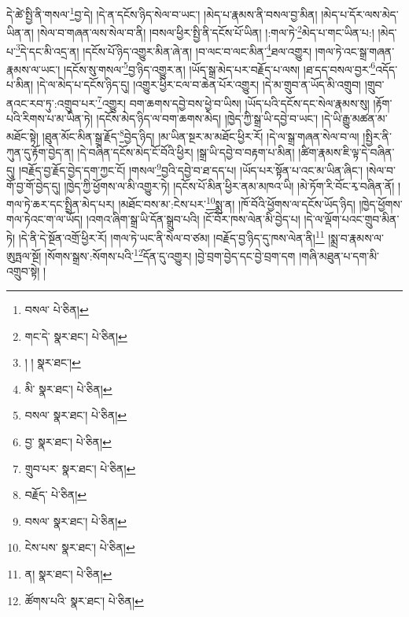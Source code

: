 དེ་ཚེ་སྤྱི་ནི་གསལ་\footnote{བསལ་  པེ་ཅིན། }བྱ་དེ། །དེ་ན་དངོས་ཉིད་སེལ་བ་ཡང་། །མེད་པ་རྣམས་ནི་བསལ་བྱ་མིན། །མེད་པ་དོར་ལས་མེད་ཡིན་ན། །སེལ་བ་གཞན་ལས་སེལ་བ་ནི། །བསལ་ཕྱིར་སྤྱི་ནི་དངོས་པོ་ཡིན། །:གལ་ཏེ་\footnote{གང་དེ་  སྣར་ཐང་།  པེ་ཅིན། }མེད་པ་གང་ཡིན་པ:། །མེད་པ་\footnote{། །  སྣར་ཐང་། }དེ་དང་མི་འདྲ་ན། །དངོས་པོ་ཉིད་འགྱུར་མིན་ཞེ་ན། །བ་ལང་བ་ལང་མིན་\footnote{མི་  སྣར་ཐང་།  པེ་ཅིན། }ཐལ་འགྱུར། །གལ་ཏེ་འང་སྒྲ་གཞན་རྣམས་ལ་ཡང་། །དངོས་སུ་གསལ་\footnote{བསལ་  སྣར་ཐང་།  པེ་ཅིན། }བྱ་ཉིད་འགྱུར་ན། །ཡོད་སྒྲ་མེད་པར་བརྗོད་པ་ལས། །ཐ་དད་བསལ་བྱར་\footnote{བྱ་  སྣར་ཐང་།  པེ་ཅིན། }འདོད་པ་མིན། །དེ་ལ་མེད་པ་དངོས་ཉིད་དུ། །འགྱུར་ཕྱིར་ངལ་བ་ཆེན་པོར་འགྱུར། །དེ་མ་གྲུབ་ན་ཡོད་མི་འགྲུབ། །གྲུབ་ནའང་རབ་ཏུ་:འགྲུབ་པར་\footnote{གྲུབ་པར་  སྣར་ཐང་།  པེ་ཅིན། }འགྱུར། བག་ཆགས་དབྱེ་བས་ཕྱེ་བ་ཡིས། །ཡོད་པའི་དངོས་དང་སེལ་རྣམས་སུ། །རྟོག་པའི་རིགས་པ་མ་ཡིན་ཏེ། །དངོས་མེད་ཉིད་ལ་བག་ཆགས་མེད། །ཁྱེད་ཀྱི་སྒྲ་ཡི་དབྱེ་བ་ཡང་། །དེ་ཡི་རྒྱུ་མཚན་མ་མཐོང་སྟེ། །ཐུན་མོང་མིན་སྒྲ་རྗོད་\footnote{བརྗོད་  པེ་ཅིན། }བྱེད་ཉིད། །མ་ཡིན་སྔར་མ་མཐོང་ཕྱིར་རོ། །དེ་ལ་སྒྲ་གཞན་སེལ་བ་ལ། །སྤྱིར་ནི་ཀུན་དུ་རྟོག་བྱེད་ན། །དེ་བཞིན་དངོས་མེད་ངོ་བོའི་ཕྱིར། །སྒྲ་ཡི་དབྱེ་བ་བརྟག་པ་མིན། །ཚིག་རྣམས་ཇི་ལྟ་དེ་བཞིན་དུ། །བརྗོད་བྱ་རྗོད་བྱེད་དག་ཀྱང་ངོ། །གསལ་\footnote{བསལ་  སྣར་ཐང་།  པེ་ཅིན། }བྱའི་དབྱེ་བ་ཐ་དད་པ། །ཡོད་པར་སྟོན་པ་འང་མ་ཡིན་ཞིང་། །སེལ་བ་གོ་བྱ་གོ་བྱེད་དུ། །ཁྱེད་ཀྱི་ཕྱོགས་ལ་མི་འགྱུར་ཏེ། །དངོས་པོ་མིན་ཕྱིར་ནམ་མཁའ་ཡི། །མེ་ཏོག་རི་བོང་རྭ་བཞིན་ནོ། །གལ་ཏེ་ཆར་དང་སྤྲིན་མེད་པར། །མཐོང་བས་མ་:ངེས་པར་\footnote{ངེས་པས་  སྣར་ཐང་།  པེ་ཅིན། }སྨྲ་ན། །ཁོ་བོའི་ཕྱོགས་ལ་དངོས་ཡོད་ཉིད། །ཁྱེད་ཕྱོགས་གལ་ཏེའང་ག་ལ་ཡོད། །འགའ་ཞིག་སྒྲ་ཡི་དོན་སྒྲུབ་པའི། །ངོ་བོར་ཁས་ལེན་མི་བྱེད་པ། །དེ་ལ་ལྡོག་པའང་གྲུབ་མིན་ཏེ། །དེ་ནི་དེ་སྔོན་འགྲོ་ཕྱིར་རོ། །གལ་ཏེ་ཡང་ནི་སེལ་བ་ཙམ། །བརྗོད་བྱ་ཉིད་དུ་ཁས་ལེན་ནི།\footnote{ན།  སྣར་ཐང་།  པེ་ཅིན། } །སྨྲ་བ་རྣམས་ལ་ཨུཏྤལ་སྔོ། །སོགས་སྒྲས་:སོགས་པའི་\footnote{ཚོགས་པའི་  སྣར་ཐང་།  པེ་ཅིན། }དོན་དུ་འགྱུར། །བྱེ་བྲག་བྱེད་དང་བྱེ་བྲག་དག །གཞི་མཐུན་པ་དག་མི་འགྲུབ་སྟེ། །
